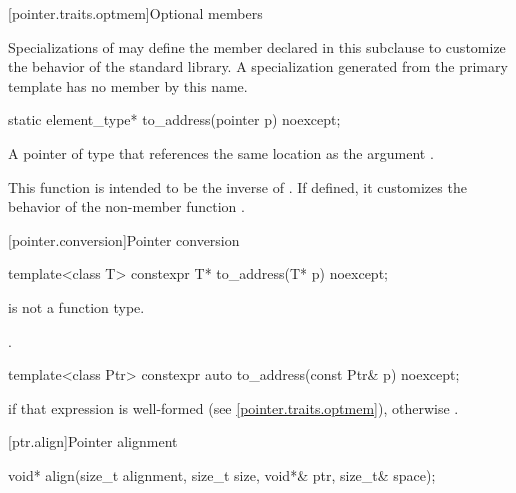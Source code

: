 [pointer.traits.optmem]{Optional members}

\pnum
Specializations of  may define the member declared
in this subclause to customize the behavior of the standard library.
A specialization generated from the  primary template
has no member by this name.

%
\begin{itemdecl}
static element_type* to_address(pointer p) noexcept;
\end{itemdecl}

\begin{itemdescr}
\pnum
\returns
A pointer of type  that references
the same location as the argument .

\pnum
\begin{note}
This function is intended to be the inverse of .
If defined, it customizes the behavior of
the non-member function
.
\end{note}
\end{itemdescr}

[pointer.conversion]{Pointer conversion}

%
\begin{itemdecl}
template<class T> constexpr T* to_address(T* p) noexcept;
\end{itemdecl}

\begin{itemdescr}
\pnum
\mandates
{} is not a function type.

\pnum
\returns
{}.
\end{itemdescr}

%
\begin{itemdecl}
template<class Ptr> constexpr auto to_address(const Ptr& p) noexcept;
\end{itemdecl}

\begin{itemdescr}
\pnum
\returns
{} if that expression is well-formed
(see \ref{pointer.traits.optmem}),
otherwise .
\end{itemdescr}

[ptr.align]{Pointer alignment}

%
\begin{itemdecl}
void* align(size_t alignment, size_t size, void*& ptr, size_t& space);
\end{itemdecl}

